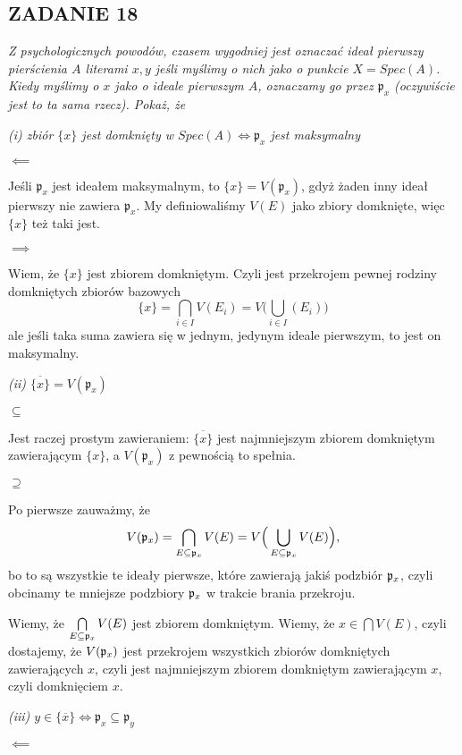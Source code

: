 \documentclass{article}
\begin{document}
\subsection*{ZADANIE 18}
\emph{\color{pink}Z psychologicznych powodów, czasem wygodniej jest oznaczać ideał pierwszy pierścienia $A$ literami $x,y$ jeśli myślimy o nich jako o punkcie $X=Spec(A)$. Kiedy myślimy o $x$ jako o ideale pierwszym $A$, oznaczamy go przez $\mathfrak{p}_x$ (oczywiście jest to ta sama rzecz). Pokaż, że}

\emph{\color{pink}(i) zbiór $\{x\}$ jest domknięty w $Spec(A)\iff\mathfrak{p}_x$ jest maksymalny}
\medskip

$\impliedby$

Jeśli $\mathfrak{p}_x$ jest ideałem maksymalnym, to $\{x\}=V(\mathfrak{p}_x)$, gdyż żaden inny ideał pierwszy nie zawiera $\mathfrak{p}_x$. My definiowaliśmy $V(E)$ jako zbiory domknięte, więc $\{x\}$ też taki jest.

$\implies$

Wiem, że $\{x\}$ jest zbiorem domkniętym. Czyli jest przekrojem pewnej rodziny domkniętych zbiorów bazowych
$$\{x\}=\bigcap\limits_{i\in I}V(E_i)=V\Big(\bigcup\limits_{i\in I}(E_i)\Big)$$
ale jeśli taka suma zawiera się w jednym, jedynym ideale pierwszym, to jest on maksymalny.
\medskip

\emph{\color{pink}(ii) $\overline{\{x\}}=V(\mathfrak{p}_x)$}

$\subseteq$

Jest raczej prostym zawieraniem: $\overline{\{x\}}$ jest najmniejszym zbiorem domkniętym zawierającym $\{x\}$, a $V(\mathfrak{p}_x)$ z pewnością to spełnia.

$\supseteq$

Po pierwsze zauważmy, że
$$V(\mathfrak{p}_x)=\bigcap\limits_{E\subseteq \mathfrak{p}_x}V(E) = V\Big(\bigcup\limits_{E\subseteq\mathfrak{p}_x}V(E)\Big),$$
bo to są wszystkie te ideały pierwsze, które zawierają jakiś podzbiór $\mathfrak{p}_x$, czyli obcinamy te mniejsze podzbiory $\mathfrak{p}_x$ w trakcie brania przekroju.

Wiemy, że $\bigcap\limits_{E\subseteq \mathfrak{p}_x}V(E)$ jest zbiorem domkniętym. Wiemy, że $x\in\bigcap V(E)$, czyli dostajemy, że $V(\mathfrak{p}_x)$ jest przekrojem wszystkich zbiorów domkniętych zawierających $x$, czyli jest najmniejszym zbiorem domkniętym zawierającym $x$, czyli domknięciem $x$.
\medskip

\emph{\color{pink}(iii) $y\in\{\overline x\}\iff\mathfrak{p}_x\subseteq\mathfrak{p}_y$}

$\impliedby$
\end{document}
